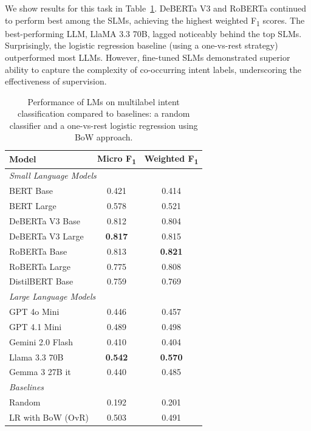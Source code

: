 \documentclass[11pt]{article}
\begin{document}
We show results for this task in Table~\ref{tab:intent-multi-slms-results}. DeBERTa V3 and RoBERTa continued to perform best among the SLMs, achieving the highest weighted F\textsubscript{1} scores. The best-performing LLM, LlaMA 3.3 70B, lagged noticeably behind the top SLMs. Surprisingly, the logistic regression baseline (using a one-vs-rest strategy) outperformed most LLMs. However, fine-tuned SLMs demonstrated superior ability to capture the complexity of co-occurring intent labels, underscoring the effectiveness of supervision.


\begin{table}[h!]
\centering
\scriptsize
\begin{tabular}{lcc}
\toprule
\textbf{Model} & \textbf{Micro F\textsubscript{1}}  & \textbf{Weighted F\textsubscript{1}} \\
\midrule
\multicolumn{2}{l}{\textit{Small Language Models}}\\
\midrule
BERT Base        & 0.421  & 0.414  \\
BERT Large        & 0.578  & 0.521  \\
DeBERTa V3 Base   & 0.812  & 0.804 \\
DeBERTa V3 Large  & \textbf{0.817} & 0.815  \\
RoBERTa Base      & 0.813 & \textbf{0.821}  \\
RoBERTa Large     & 0.775  & 0.808  \\
DistilBERT Base   & 0.759 & 0.769  \\
\midrule
\multicolumn{2}{l}{\textit{Large Language Models}}\\
\midrule
GPT 4o Mini              & 0.446 & 0.457 \\
GPT 4.1 Mini             & 0.489 & 0.498 \\
Gemini 2.0 Flash           & 0.410 & 0.404 \\
Llama 3.3 70B            & \textbf{0.542} &\textbf{0.570} \\
Gemma 3 27B it              & 0.440 & 0.485 \\
\midrule
\multicolumn{2}{l}{\textit{Baselines}}\\
\midrule
Random     & 0.192 & 0.201 \\
LR with BoW (OvR)   & 0.503 & 0.491 \\
\bottomrule
\end{tabular}
\caption{Performance of LMs on multilabel intent classification compared to baselines: a random classifier and a one-vs-rest logistic regression using BoW approach.}
\label{tab:intent-multi-slms-results}
\end{table}
\end{document}
